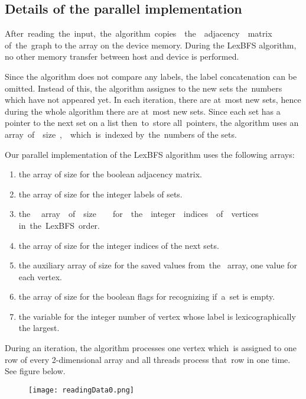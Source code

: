 \documentclass[a4paper, 11pt]{article}
\begin{document}
\subsection{Details of the parallel implementation}

After~reading~the~input,~the~algorithm~copies~~the~~adjacency~~matrix of~the~graph to the array 
on the device memory. During the LexBFS algorithm, no other memory transfer between host 
and device is performed.

Since the algorithm does not compare any labels, the label concatenation can be omitted. 
Instead of this, the algorithm assignes to the new sets the~numbers which have not appeared 
yet. In each iteration, there are at~most  new sets, hence during the whole algorithm 
there are at~most  new sets. Since each set has a pointer to the next set on a list 
then~to~store all~pointers, the algorithm uses an array~of~~size~,~~which~is~indexed 
by~the~numbers of the sets.

Our parallel implementation of the LexBFS algorithm uses the following arrays:

\begin{enumerate}
    \item the  array of size  for the boolean adjacency matrix.
    \item the  array of size  for the integer labels of sets.
    \item the ~~array~~of~~size~~~~for~~the~~integer~~indices~~of~~vertices in~the~LexBFS~order.
    \item the  array of size  for the integer indices of the next sets.
    \item the  auxiliary array of size  for the saved values 
        from~the~ array, one value for each vertex.
    \item the  array of size  for the boolean flags for recognizing 
        if~a~set is empty.
    \item the  variable for the integer number of vertex whose label is 
        lexicographically the largest.
\end{enumerate}

During an iteration, the algorithm processes one  vertex which~is assigned to one row 
of every 2-dimensional array and all threads process that~row in one time. See figure below.

\begin{figure}[h]
    \begin{center}
        \texttt{[image: readingData0.png]}
    \end{center}
\end{figure}
\end{document}
